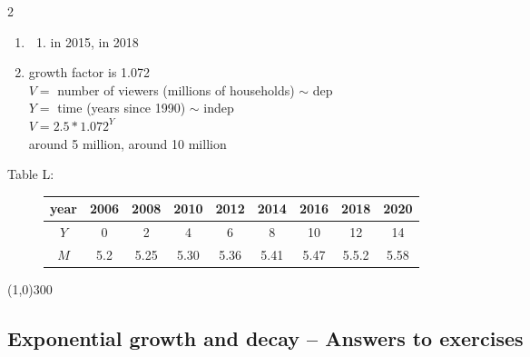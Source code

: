 \begin{multicols} {2}
\begin{enumerate}
\item %
\begin{enumerate}
\item in 2015, in 2018
\end{enumerate}

\item %
growth factor is 1.072 \\ $V=$ number of viewers (millions of households) $\sim$ dep \\ $Y=$ time (years since 1990) $\sim$ indep \\ $V = 2.5 \ast 1.072 ^Y$ \\ around 5 million, around 10 million

\end{enumerate}
\end{multicols}

\bigskip

\begin{description}
\item[\quad Table L: \quad] 
\begin{tabular} {|c| |c|c |c|c |c|c|c |c|}\hline
year & 2006 & 2008 & 2010 & 2012 & 2014 & 2016 & 2018 & 2020 \\ \hline
$Y$ &  0 & 2 & 4 & 6 & 8 & 10 & 12 & 14 \\ \hline
$M$ & 5.2 & 5.25 & 5.30 & 5.36 & 5.41 & 5.47 & 5.5.2 & 5.58\\ \hline
\end{tabular} 
\end{description}

\bigskip 

\begin{center}
\line(1,0){300} %
\end{center}

\subsection {Exponential growth and decay -- Answers to exercises} %


